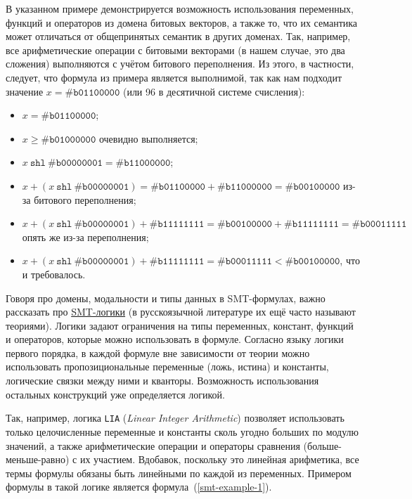 В указанном примере демонстрируется возможность использования переменных, функций и операторов из домена битовых векторов, а также то, что их семантика может отличаться от общепринятых семантик в других доменах. Так, например, все арифметические операции с битовыми векторами (в нашем случае, это два сложения) выполняются с учётом битового переполнения. Из этого, в частности, следует, что формула из примера является выполнимой, так как нам подходит значение $x = \texttt{\#b01100000}$ (или 96 в десятичной системе счисления):
\begin{itemize}
    \item $x = \texttt{\#b01100000}$;
    \item $x \ge \texttt{\#b01000000}$ очевидно выполняется;
    \item $x \ \texttt{shl} \ \texttt{\#b00000001} = \texttt{\#b11000000}$;
    \item $x + (x \ \texttt{shl} \ \texttt{\#b00000001}) = \texttt{\#b01100000} + \texttt{\#b11000000} = \texttt{\#b00100000}$ из-за битового переполнения;
    \item $x + (x \ \texttt{shl} \ \texttt{\#b00000001}) + \texttt{\#b11111111} = \texttt{\#b00100000} + \texttt{\#b11111111} = \texttt{\#b00011111}$ опять же из-за переполнения;
    \item $x + (x \ \texttt{shl} \ \texttt{\#b00000001}) + \texttt{\#b11111111} = \texttt{\#b00011111} < \texttt{\#b00100000}$, что и требовалось.
\end{itemize}



Говоря про домены, модальности и типы данных в SMT-формулах, важно рассказать про \underline{SMT-логики} (в русскоязычной литературе их ещё часто называют теориями). Логики задают ограничения на типы переменных, констант, функций и операторов, которые можно использовать в формуле. Согласно языку логики первого порядка, в каждой формуле вне зависимости от теории можно использовать пропозициональные переменные (ложь, истина) и константы, логические связки между ними и кванторы. Возможность использования остальных конструкций уже определяется логикой.

Так, например, логика \texttt{LIA} (\textit{Linear Integer Arithmetic}) позволяет использовать только целочисленные переменные и константы сколь угодно больших по модулю значений, а также арифметические операции и операторы сравнения (больше-меньше-равно) с их участием. Вдобавок, поскольку это линейная арифметика, все термы формулы обязаны быть линейными по каждой из переменных. Примером формулы в такой логике является формула~(\ref{smt-example-1}).

